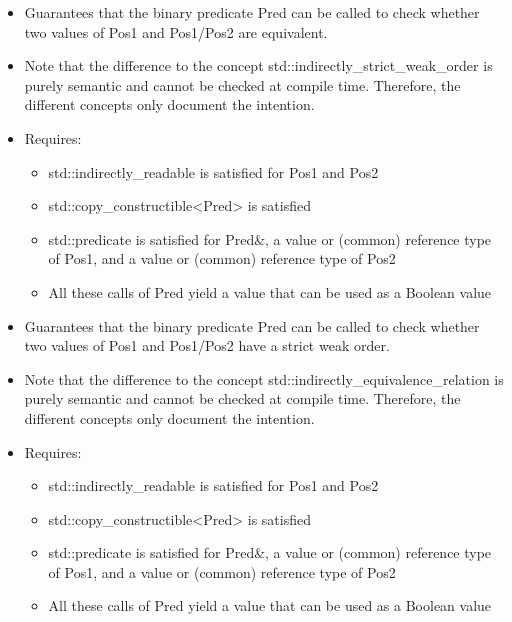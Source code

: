 \begin{itemize}
\item
Guarantees that the binary predicate Pred can be called to check whether two values of Pos1 and Pos1/Pos2 are equivalent.

\item
Note that the difference to the concept std::indirectly\_strict\_weak\_order is purely semantic and cannot be checked at compile time. Therefore, the different concepts only document the intention.

\item
Requires:
\begin{itemize}
\item
std::indirectly\_readable is satisfied for Pos1 and Pos2

\item
std::copy\_constructible<Pred> is satisfied

\item
std::predicate is satisfied for Pred\&, a value or (common) reference type of Pos1, and a value or (common) reference type of Pos2

\item
All these calls of Pred yield a value that can be used as a Boolean value
\end{itemize}
\end{itemize}


\begin{itemize}
\item
Guarantees that the binary predicate Pred can be called to check whether two values of Pos1 and Pos1/Pos2 have a strict weak order.

\item
Note that the difference to the concept std::indirectly\_equivalence\_relation is purely semantic and cannot be checked at compile time. Therefore, the different concepts only document the intention.

\item
Requires:
\begin{itemize}
\item
std::indirectly\_readable is satisfied for Pos1 and Pos2

\item
std::copy\_constructible<Pred> is satisfied

\item
std::predicate is satisfied for Pred\&, a value or (common) reference type of Pos1, and a value or (common) reference type of Pos2

\item
All these calls of Pred yield a value that can be used as a Boolean value
\end{itemize}
\end{itemize}










